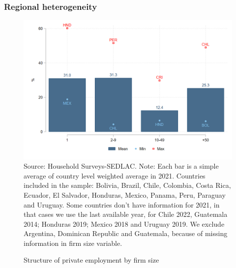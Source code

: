 \documentclass{beamer}
\begin{document}
\begin{frame}
\frametitle{Regional heterogeneity}
\begin{figure}[!htb]
        \justifying
        \caption{Structure of private employment by firm size}     
        \includegraphics[scale=.2]{latex/figures/Snapshot/Structure of employment by firm size.png}
        \label{fig:firmsize}
        \footnotesize{Source: Household Surveys-SEDLAC.}
        \footnotesize{Note: Each bar is a simple average of country level weighted average in 2021. Countries included in the sample: Bolivia, Brazil, Chile, Colombia, Costa Rica, Ecuador, El Salvador, Honduras, Mexico, Panama, Peru, Paraguay and Uruguay. Some countries don’t have information for 2021, in that cases we use the last available year, for Chile 2022, Guatemala 2014; Honduras 2019; Mexico 2018 and Uruguay 2019. We exclude Argentina, Dominican Republic and Guatemala, because of missing information in firm size variable.}
        \end{figure}

\end{frame}
\end{document}
